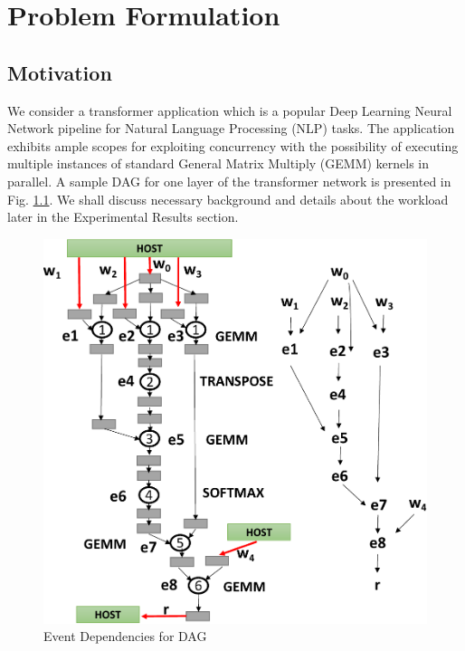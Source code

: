 
\chapter{Problem Formulation} %

\label{Chapter3} %


\section{Motivation} \label{sec:motivation}
We consider a transformer application \cite{DBLP:journals/corr/VaswaniSPUJGKP17} which is a popular Deep Learning Neural Network pipeline for Natural Language Processing (NLP) tasks. The application exhibits ample scopes for exploiting concurrency with the possibility of executing multiple instances of standard General Matrix Multiply (GEMM) kernels in parallel. A sample DAG for one layer of the transformer network is presented in Fig. \ref{fig:motivation0}. We shall discuss necessary background and details about the workload later in the Experimental Results section.  
	\begin{figure}[ht]  
		\centering
		\includegraphics[scale=0.50]{Pictures/Transformer_modified.pdf}
		\caption{Event Dependencies for  DAG\label{fig:motivation0}}
	\end{figure}
